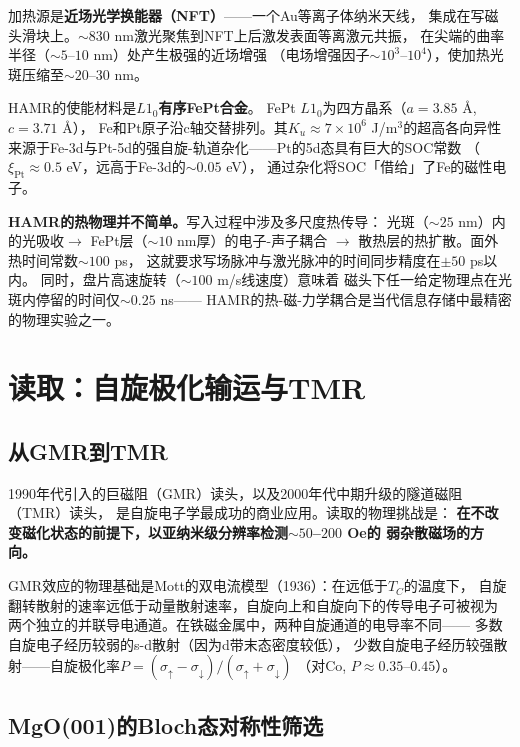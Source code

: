 \documentclass[11pt,a4paper,openany]{book}
\theoremstyle{definition}
\theoremstyle{plain}
\theoremstyle{remark}
\begin{document}
加热源是\textbf{近场光学换能器（NFT）}——一个Au等离子体纳米天线，
集成在写磁头滑块上。$\sim 830$ nm激光聚焦到NFT上后激发表面等离激元共振，
在尖端的曲率半径（$\sim 5$--$10$ nm）处产生极强的近场增强
（电场增强因子$\sim 10^3$--$10^4$），使加热光斑压缩至$\sim 20$--$30$ nm。

HAMR的使能材料是\textbf{$L1_0$有序FePt合金}。
FePt $L1_0$为四方晶系（$a = 3.85$ \AA, $c = 3.71$ \AA），
Fe和Pt原子沿c轴交替排列。其$K_u \approx 7 \times 10^6$ J/m$^3$的超高各向异性
来源于Fe-3d与Pt-5d的强自旋-轨道杂化——Pt的5d态具有巨大的SOC常数
（$\xi_{\text{Pt}} \approx 0.5$ eV，远高于Fe-3d的$\sim 0.05$ eV），
通过杂化将SOC「借给」了Fe的磁性电子。

\begin{physbox}
\textbf{HAMR的热物理并不简单。}写入过程中涉及多尺度热传导：
光斑（$\sim 25$ nm）内的光吸收$\to$ FePt层（$\sim 10$ nm厚）的电子-声子耦合
$\to$ 散热层的热扩散。面外热时间常数$\sim 100$ ps，
这就要求写场脉冲与激光脉冲的时间同步精度在$\pm 50$ ps以内。
同时，盘片高速旋转（$\sim 100$ m/s线速度）意味着
磁头下任一给定物理点在光斑内停留的时间仅$\sim 0.25$ ns——
HAMR的热-磁-力学耦合是当代信息存储中最精密的物理实验之一。
\end{physbox}

\section{读取：自旋极化输运与TMR}

\subsection{从GMR到TMR}

1990年代引入的巨磁阻（GMR）读头，以及2000年代中期升级的隧道磁阻（TMR）读头，
是自旋电子学最成功的商业应用。读取的物理挑战是：
\textbf{在不改变磁化状态的前提下，以亚纳米级分辨率检测$\sim 50$--$200$ Oe的
弱杂散磁场的方向。}

GMR效应的物理基础是Mott的双电流模型（1936）：在远低于$T_C$的温度下，
自旋翻转散射的速率远低于动量散射速率，自旋向上和自旋向下的传导电子可被视为
两个独立的并联导电通道。在铁磁金属中，两种自旋通道的电导率不同——
多数自旋电子经历较弱的s-d散射（因为d带末态密度较低），
少数自旋电子经历较强散射——自旋极化率$P = (\sigma_\uparrow - \sigma_\downarrow)/(\sigma_\uparrow + \sigma_\downarrow)$
（对Co, $P \approx 0.35$--$0.45$）。

\subsection{MgO(001)的Bloch态对称性筛选}
\end{document}
